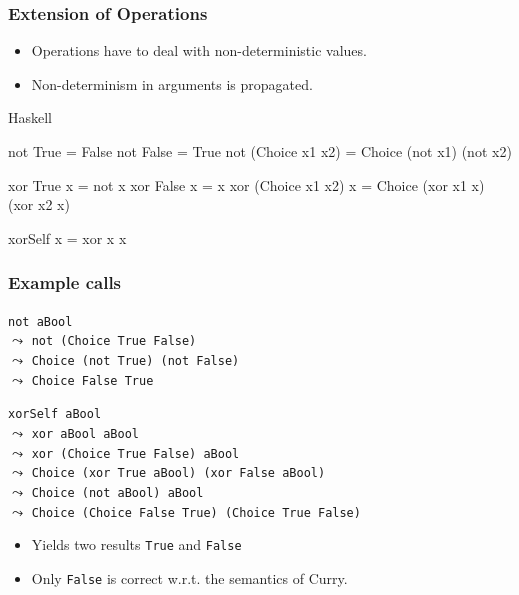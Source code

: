 \documentclass[utf8]{beamer}
\newenvironment{program}{\begin{semiverbatim}\small}{\end{semiverbatim}}
\begin{document}
\begin{frame}[fragile]
\frametitle{Extension of Operations}
\begin{itemize}
  \item Operations have to deal with non-deterministic values.
  \item Non-determinism in arguments is propagated.
\end{itemize}
\pause
\begin{block}{Haskell}
\begin{program}
not True           = False
not False          = True
not (Choice x1 x2) = Choice (not x1) (not x2)

xor True           x = not x
xor False          x = x
xor (Choice x1 x2) x = Choice (xor x1 x) (xor x2 x)

xorSelf x = xor x x
\end{program}
\end{block}
\end{frame}


\begin{frame}[fragile]
\frametitle{Example calls}
\begin{example}
\verb!not aBool!\\
$\leadsto$ \verb!not (Choice True False)!\\
$\leadsto$ \verb!Choice (not True) (not False)!\\
$\leadsto$ \verb!Choice False True!
\end{example}
\pause
\begin{example}
\verb!xorSelf aBool!\\
$\leadsto$ \verb!xor aBool aBool!\\
$\leadsto$ \verb!xor (Choice True False) aBool!\\
$\leadsto$ \verb!Choice (xor True aBool) (xor False aBool)!\\
$\leadsto$ \verb!Choice (not aBool) aBool!\\
$\leadsto$ \verb!Choice (Choice False True) (Choice True False)!
\end{example}
\begin{itemize}
  \item Yields two results \verb!True! and \verb!False!
  \item Only \verb!False! is correct w.r.t. the semantics of Curry.
\end{itemize}
\end{frame}
\end{document}

